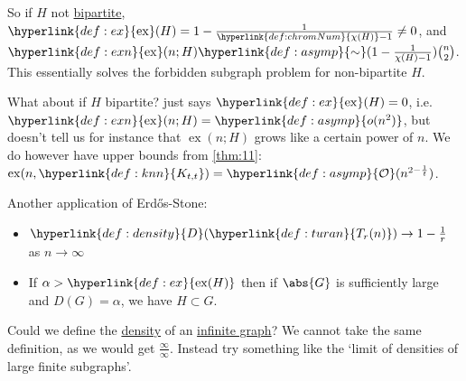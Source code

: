 \documentclass{article}
\DeclareMathOperator{\ext}{ex}
\DeclareMathOperator{\ud}{ud}
\begin{document}
So if $H$ not \hyperlink{def:bipartite}{bipartite}, $\hyperlink{def:ex}{\ext}(H) = 1 - \frac{1}{\hyperlink{def:chromNum}{\chi(H)} - 1} \neq 0$, and $\hyperlink{def:exn}{\ext}(n; H) \hyperlink{def:asymp}{\sim} (1 - \frac{1}{\chi(H) - 1}) \binom{n}{2}$.
This essentially solves the forbidden subgraph problem for non-bipartite $H$.

What about if $H$ bipartite?
 just says $\hyperlink{def:ex}{\ext}(H) = 0$, i.e. $\hyperlink{def:exn}{\ext}(n; H) = \hyperlink{def:asymp}{o(n^2)}$, but doesn't tell us for instance that $\ext(n; H)$ grows like a certain power of $n$.
We do however have upper bounds from \cref{thm:11}: $\ext(n, \hyperlink{def:knn}{K_{t, t}}) = \hyperlink{def:asymp}{\mathcal{O}}(n^{2 - \frac{1}{t}})$.

Another application of Erd\H{o}s-Stone:

\begin{eg}
    \leavevmode
    \begin{itemize}
        \item $\hyperlink{def:density}{D}(\hyperlink{def:turan}{T_r(n)}) \to 1 - \frac{1}{r}$ as $n \to \infty$
        \item If $\alpha > \hyperlink{def:ex}{\ext(H)}$ then if $\abs{G}$ is sufficiently large and $D(G) = \alpha$, we have $H \subset G$.
    \end{itemize}
\end{eg}

Could we define the \hyperlink{def:density}{density} of an \hyperlink{def:infGraph}{infinite graph}?
We cannot take the same definition, as we would get $\frac{\infty}{\infty}$.
Instead try something like the `limit of densities of large finite subgraphs'.

\end{document}
